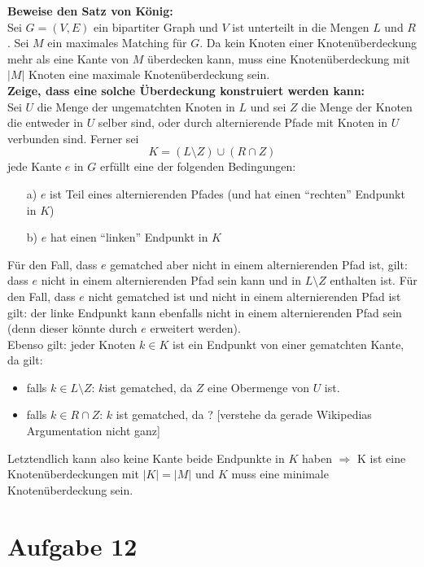 \documentclass[10pt,a4paper]{article}
\begin{document}
    \textbf{Beweise den Satz von König:} \\
    Sei $G = (V,E)$ ein bipartiter Graph und $V$ ist unterteilt in
    die Mengen $L$ und $R$. Sei $M$ ein maximales Matching für $G$.
    Da kein Knoten einer Knotenüberdeckung mehr als eine Kante von $M$
    überdecken kann, muss eine Knotenüberdeckung mit $|M|$ Knoten eine
    maximale Knotenüberdeckung sein.
    \\
    \textbf{Zeige, dass eine solche Überdeckung konstruiert werden kann:}
    \\
    Sei $U$ die Menge der ungematchten Knoten in $L$ und sei $Z$ die Menge
    der Knoten die entweder in $U$ selber sind, oder durch alternierende Pfade mit
    Knoten in $U$ verbunden sind. Ferner sei
    $$
        K = (L\setminus Z) \cup (R\cap Z)
    $$
    jede Kante $e$ in $G$ erfüllt eine der folgenden Bedingungen:
    \begin{itemize}
        \item[a)] $e$ ist Teil eines alternierenden Pfades (und hat einen ``rechten''
        Endpunkt in $K$)
        \item[b)] $e$ hat einen ``linken'' Endpunkt in $K$
    \end{itemize}
    Für den Fall, dass $e$ gematched aber nicht in einem alternierenden Pfad ist, gilt:
    dass $e$ nicht in einem alternierenden Pfad sein kann und in $L\setminus Z$
    enthalten ist. Für den Fall, dass $e$ nicht gematched ist und nicht in
    einem alternierenden Pfad ist gilt: der linke Endpunkt  kann ebenfalls nicht
    in einem alternierenden Pfad sein (denn dieser könnte durch $e$ erweitert werden).
   \\
   Ebenso gilt: jeder Knoten $k \in K$ ist ein Endpunkt von einer gematchten
   Kante, da gilt:
   \begin{itemize}
        \item  falls $k \in L\setminus Z $: $k $ist gematched, da $Z$ eine Obermenge von $U$ ist.
        \item falls $k \in R\cap Z$: $k$ ist gematched, da ? [verstehe da gerade Wikipedias Argumentation nicht ganz]
        
   \end{itemize}
    Letztendlich kann also keine Kante beide Endpunkte in $K$ haben
    $\Rightarrow$ K ist eine Knotenüberdeckungen mit $|K| = |M|$ und $K$ muss 
    eine minimale Knotenüberdeckung sein.
    
\section*{Aufgabe 12}
\end{document}
